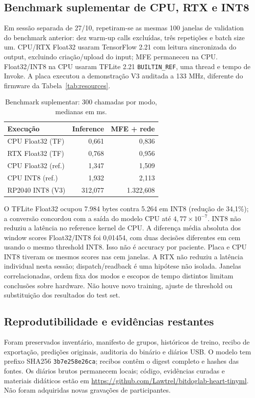 \documentclass[9pt,twocolumn,twoside,lineno]{MSBJournal}
\begin{document}
\subsection{Benchmark suplementar de CPU, RTX e INT8}
Em sessão separada de 27/10, repetiram-se as mesmas 100 janelas de validation do benchmark anterior: dez warm-up calls excluídas, três repetições e batch size um. CPU/RTX Float32 usaram TensorFlow 2.21 com leitura sincronizada do output, excluindo criação/upload do input; MFE permaneceu na CPU. Float32/INT8 na CPU usaram TFLite 2.21 \texttt{BUILTIN\_REF}, uma thread e tempo de Invoke. A placa executou a demonstração V3 auditada a 133 MHz, diferente do firmware da Tabela~\ref{tab:resources}.
\begin{table}[t]\centering
\caption{Benchmark suplementar: 300 chamadas por modo, medianas em ms.}\label{tab:fresh}
\begin{tabular}{lrr}\toprule
Execução & Inference & MFE + rede\\\midrule
CPU Float32 (TF) & 0,661 & 0,836\\
RTX Float32 (TF) & 0,768 & 0,956\\
CPU Float32 (ref.) & 1,347 & 1,509\\
CPU INT8 (ref.) & 1,932 & 2,113\\
RP2040 INT8 (V3) & 312,077 & 1.322,608\\\bottomrule
\end{tabular}\end{table}
O TFLite Float32 ocupou 7.984 bytes contra 5.264 em INT8 (redução de 34,1\%); a conversão concordou com a saída do modelo CPU até $4,77\times10^{-7}$. INT8 não reduziu a latência no reference kernel de CPU. A diferença média absoluta dos window scores Float32/INT8 foi 0,01454, com duas decisões diferentes em cem usando o mesmo threshold INT8. Isso não é accuracy por paciente. Placa e CPU INT8 tiveram os mesmos scores nas cem janelas. A RTX não reduziu a latência individual nesta sessão; dispatch/readback é uma hipótese não isolada. Janelas correlacionadas, ordem fixa dos modos e escopos de tempo distintos limitam conclusões sobre hardware. Não houve novo training, ajuste de threshold ou substituição dos resultados do test set.

\subsection{Reprodutibilidade e evidências restantes}
Foram preservados inventário, manifesto de grupos, históricos de treino, recibo de exportação, predições originais, auditoria do binário e diários USB. O modelo tem prefixo SHA256 \texttt{3b7e258e26ca}; recibos contêm o digest completo e hashes das fontes. Os diários brutos permanecem locais; código, evidências curadas e materiais didáticos estão em \url{https://github.com/Lawtrel/bitdoglab-heart-tinyml}. Não foram adquiridas novas gravações de participantes.
\end{document}
